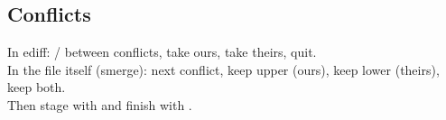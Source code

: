 \subsection{Conflicts}
\begin{keys}
\end{keys}
In ediff:  /  between conflicts,  take ours,  take
theirs,  quit. \\
In the file itself (smerge):  next conflict,  keep upper (ours),  keep lower (theirs),
 keep both. \\
Then stage with  and finish with .

